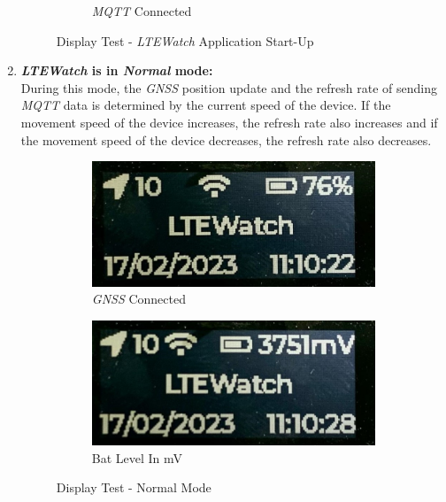 \documentclass[Report.tex]{subfiles}
\begin{document}
\begin{enumerate}
\begin{figure}[H]
\begin{subfigure}{.3\textwidth}
\caption{\textit{MQTT} Connected}
\end{subfigure}	
	\caption{Display Test - \textit{LTEWatch} Application Start-Up}
	\label{fig:display_1}
\end{figure}

\item \textbf{\textit{LTEWatch} is in \textit{Normal} mode:}\\
During this mode, the \textit{GNSS} position update and the refresh rate of sending \textit{MQTT} data is determined by the current speed of the device. If the movement speed of the device increases, the refresh rate also increases and if the movement speed of the device decreases, the refresh rate also decreases.
\begin{figure}[H]
	\centering
\begin{subfigure}{.3\textwidth}
\centering
\includegraphics[width=1\textwidth]{Include/Figure/modification/display_9}
\caption{\textit{GNSS} Connected}
\end{subfigure}	
\begin{subfigure}{.3\textwidth}
\centering
\includegraphics[width=1\textwidth]{Include/Figure/modification/display_10}
\caption{Bat Level In \si{\milli\volt}}
\end{subfigure}	
	\caption{Display Test - Normal Mode}
	\label{fig:display_1}
\end{figure}
\begin{itemize}

\end{itemize}
\end{enumerate}
\end{document}

